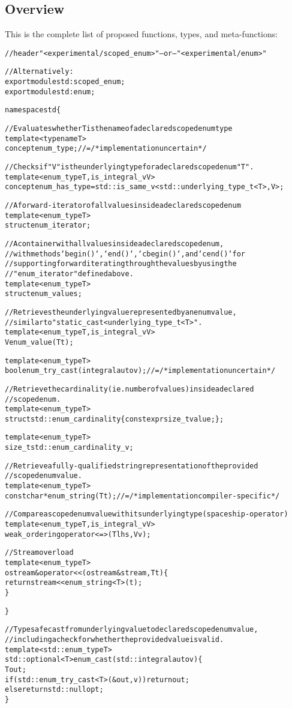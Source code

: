 \documentclass[a4paper, 12pt]{article}
\begin{document}
\newpage
\subsection{Overview}

This is the complete list of proposed functions, types, and meta-functions:

\begin{alltt}\footnotesize
// header "<experimental/scoped\_enum>" -- or -- "<experimental/enum>"

// Alternatively:
export module std : scoped\_enum;
export module std : enum;

namespace std \{

  // Evaluates whether T is the name of a declared scoped enum type
  template<typename T>
  concept enum\_type; // = /* implementation uncertain */

  // Checks if "V" is the underlying type for a declared scoped enum "T".
  template<enum\_type T, is\_integral\_v V>
  concept enum\_has\_type = std::is\_same\_v<std::underlying\_type\_t<T>, V>;

  // A forward-iterator of all values inside a declared scoped enum
  template<enum\_type T>
  struct enum\_iterator;

  // A container with all values inside a declared scoped enum,
  // with methods `begin()`, `end()`, `cbegin()`, and `cend()` for
  // supporting forward iterating through the values by using the
  // "enum\_iterator" defined above.
  template<enum\_type T>
  struct enum\_values;

  // Retrieves the underlying value represented by an enum value,
  // similar to "static\_cast<underlying\_type\_t<T>".
  template<enum\_type T, is\_integral\_v V>
  V enum\_value(T t);

  template<enum\_type T>
  bool enum\_try\_cast(integral auto v); // = /* implementation uncertain */

  // Retrieve the cardinality (ie. number of values) inside a declared
  // scoped enum.
  template<enum\_type T>
  struct std::enum\_cardinality \{ constexpr size\_t value; \};

  template<enum\_type T>
  size\_t std::enum\_cardinality\_v;

  // Retrieve a fully-qualified string representation of the provided
  // scoped enum value.
  template<enum\_type T>
  const char* enum\_string(T t); // = /* implementation compiler-specific */

  // Compare a scoped enum value with its underlying type (spaceship-operator)
  template<enum\_type T, is\_integral\_v V>
  weak\_ordering operator<=>(T lhs, V v);

  // Stream overload
  template<enum\_type T>
  ostream& operator<<(ostream& stream, T t) \{
    return stream << enum\_string<T>(t);
  \}

\}

// Typesafe cast from underlying value to declared scoped enum value,
// including a check for whether the provided value is valid.
template<std::enum\_type T>
std::optional<T> enum\_cast(std::integral auto v) \{
  T out;
  if (std::enum\_try\_cast<T>(&out, v)) return out;
  else return std::nullopt;
\}

\end{alltt}
\end{document}
